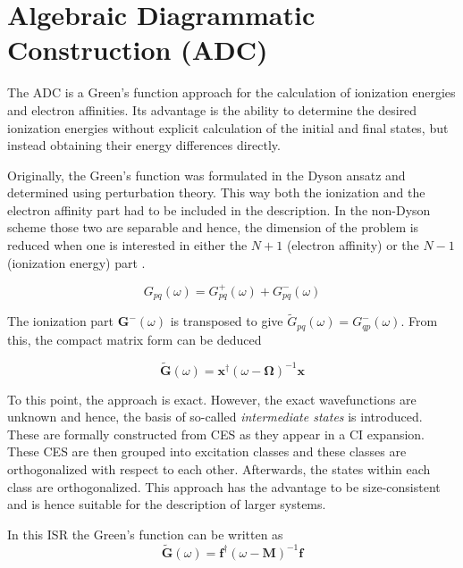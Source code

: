 \chapter{Algebraic Diagrammatic Construction (ADC)}

The \acl{ADC} is a Green's function approach for the calculation of ionization
energies and electron affinities.
Its advantage is the ability to determine the desired ionization energies
without explicit calculation of the initial and final states, but instead
obtaining their energy differences directly.

Originally, the Green's function was formulated in the Dyson ansatz and
determined using perturbation theory. This way both the ionization and the
electron affinity part had to be included in the description. In the non-Dyson
scheme those two are separable and hence, the dimension of the problem is reduced
when one is interested in either the $N+1$ (electron affinity)
or the $N-1$ (ionization energy) part \cite{Schirmer98}.

\begin{equation}
 G_{pq}(\omega) = G^+_{pq}(\omega) + G^-_{pq}(\omega)
\end{equation}

The ionization part $\mathbf{G^-}(\omega)$ is transposed to give
$\tilde{G}_{pq}(\omega) = G^-_{qp}(\omega)$. From this, the compact matrix
form can be deduced

\begin{equation}\label{matrixspec}
\mathbf{\tilde{G}}(\omega) = \mathbf{x}^\dagger(\omega-\mathbf{\Omega})^{-1}\mathbf{x}
\end{equation}

To this point, the approach is exact. However, the exact wavefunctions are unknown
and hence, the basis of so-called \emph{intermediate states} is introduced. These
are formally constructed from \ac{CES} as they appear in a
\ac{CI} expansion. These \ac{CES} are then grouped into excitation classes
and these classes are orthogonalized with respect to each other. Afterwards,
the states within each class are orthogonalized. 
This approach has the advantage to be size-consistent and is hence
suitable for the description of larger systems. \cite{Mertins96_1}

In this \ac{ISR} the Green's function can be written as
\begin{equation}\label{isradc}
\mathbf{\tilde{G}}(\omega) = \mathbf{f}^\dagger(\omega-\mathbf{M})^{-1}\mathbf{f}
\end{equation}

